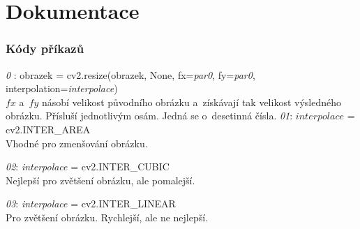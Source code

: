 \documentclass[12pt]{report}
\begin{document}
\chapter{Dokumentace}
\subsection{Kódy příkazů}
\begin{outline}
\1 \emph{0} : obrazek = cv2.resize(obrazek, None, fx=\emph{par0}, fy=\emph{par0}, \\interpolation=\emph{interpolace})\\
	$fx$ a~$fy$ násobí velikost původního obrázku a~získávají tak velikost výsledného obrázku. Přísluší jednotlivým osám. Jedná se o~desetinná čísla. \parencite{CV_resize}
	\2 \emph{01}: $interpolace$ = cv2.INTER\_AREA\\ Vhodné pro zmenšování obrázku.
	
	\2 \emph{02}: \emph{interpolace} = cv2.INTER\_CUBIC\\ Nejlepší pro zvětšení obrázku, ale pomalejší.
	
	\2 \emph{03}: \emph{interpolace} = cv2.INTER\_LINEAR\\ Pro zvětšení obrázku. Rychlejší, ale ne nejlepší.  
	

\end{outline}
\end{document}
